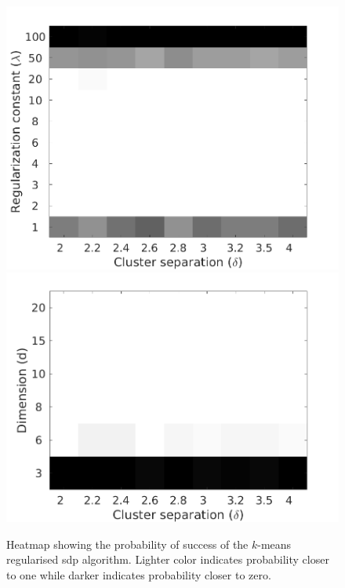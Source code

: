 \begin{figure}[t]
  \label{a-figure:simulation}
  \centering
  \includegraphics[width=\textwidth]{figures/optimizationClustering/deltaLambda.png}
  \includegraphics[width=\textwidth]{figures/optimizationClustering/deltaD.png}
  \caption{Heatmap showing the probability of success of the $k$-means regularised sdp algorithm. Lighter color indicates probability closer to one while darker indicates probability closer to zero.}
\end{figure}
